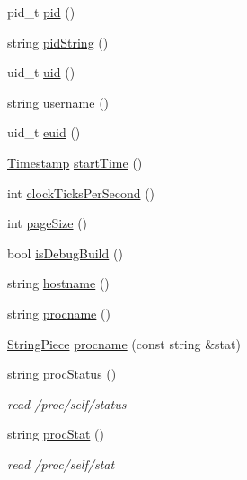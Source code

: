 \begin{DoxyCompactItemize}
\item 
pid\+\_\+t \hyperlink{namespacemuduo_1_1ProcessInfo_a9b565d9cb6c35649f0feeeaa8b26dd7b}{pid} ()
\item 
string \hyperlink{namespacemuduo_1_1ProcessInfo_af54b6cc2e94622bf45a9ced0093b7dae}{pid\+String} ()
\item 
uid\+\_\+t \hyperlink{namespacemuduo_1_1ProcessInfo_a056245f62bbe6e8abdcd42171a432aac}{uid} ()
\item 
string \hyperlink{namespacemuduo_1_1ProcessInfo_a54e6907a19c94da2cf5db8dcad530262}{username} ()
\item 
uid\+\_\+t \hyperlink{namespacemuduo_1_1ProcessInfo_a7313897d7ec7dc5bbdd8f3f88c449b7e}{euid} ()
\item 
\hyperlink{classmuduo_1_1Timestamp}{Timestamp} \hyperlink{namespacemuduo_1_1ProcessInfo_a3662fa984eef69a557c6d997aba58e18}{start\+Time} ()
\item 
int \hyperlink{namespacemuduo_1_1ProcessInfo_af8d3ce061f87c1a208c8e164e9b69882}{clock\+Ticks\+Per\+Second} ()
\item 
int \hyperlink{namespacemuduo_1_1ProcessInfo_a3aab01e3a27d7f88b7d8fffceb529c64}{page\+Size} ()
\item 
bool \hyperlink{namespacemuduo_1_1ProcessInfo_aabe41272bf5623d260fe92399071ed4e}{is\+Debug\+Build} ()
\item 
string \hyperlink{namespacemuduo_1_1ProcessInfo_ac60f3a33a07318aa231cc3d07f6ee419}{hostname} ()
\item 
string \hyperlink{namespacemuduo_1_1ProcessInfo_ac8a6ab8cb6657fc7ddba4a8be2f60e2b}{procname} ()
\item 
\hyperlink{classmuduo_1_1StringPiece}{String\+Piece} \hyperlink{namespacemuduo_1_1ProcessInfo_acb222d923a768bc8e9ecceaf21ac4ba3}{procname} (const string \&stat)
\item 
string \hyperlink{namespacemuduo_1_1ProcessInfo_a930c5a6d17d6ba40f7011643f4442c41}{proc\+Status} ()
\begin{DoxyCompactList}\small\item\em read /proc/self/status \end{DoxyCompactList}\item 
string \hyperlink{namespacemuduo_1_1ProcessInfo_a8f557f94d9b8cdb55a8d21c5b6c70634}{proc\+Stat} ()
\begin{DoxyCompactList}\small\item\em read /proc/self/stat \end{DoxyCompactList}\item 

\end{DoxyCompactItemize}
